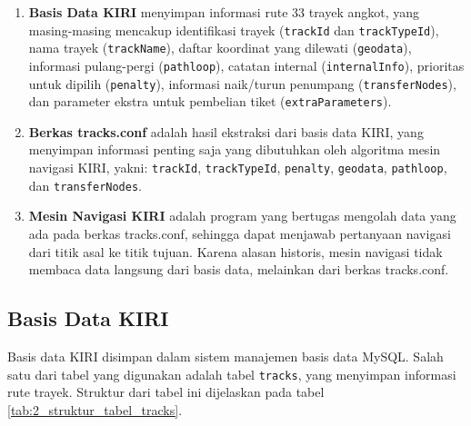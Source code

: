 \begin{enumerate}
	\item \textbf{Basis Data KIRI} menyimpan informasi rute 33 trayek angkot, yang masing-masing mencakup identifikasi trayek (\texttt{trackId} dan \texttt{trackTypeId}), nama trayek (\texttt{trackName}), daftar koordinat yang dilewati (\texttt{geodata}), informasi pulang-pergi (\texttt{pathloop}), catatan internal (\texttt{internalInfo}), prioritas untuk dipilih (\texttt{penalty}), informasi naik/turun penumpang (\texttt{transferNodes}), dan parameter ekstra untuk pembelian tiket (\texttt{extraParameters}).
	\item \textbf{Berkas tracks.conf} adalah hasil ekstraksi dari basis data KIRI, yang menyimpan informasi penting saja yang dibutuhkan oleh algoritma mesin navigasi KIRI, yakni: \texttt{trackId}, \texttt{trackTypeId}, \texttt{penalty}, \texttt{geodata}, \texttt{pathloop}, dan \texttt{transferNodes}.
	\item \textbf{Mesin Navigasi KIRI} adalah program yang bertugas mengolah data yang ada pada berkas tracks.conf, sehingga dapat menjawab pertanyaan navigasi dari titik asal ke titik tujuan. Karena alasan historis, mesin navigasi tidak membaca data langsung dari basis data, melainkan dari berkas tracks.conf.
\end{enumerate}

\subsection{Basis Data KIRI}
Basis data KIRI disimpan dalam sistem manajemen basis data MySQL. Salah satu dari tabel yang digunakan adalah tabel \texttt{tracks}, yang menyimpan informasi rute trayek. Struktur dari tabel ini dijelaskan pada tabel \ref{tab:2_struktur_tabel_tracks}.

